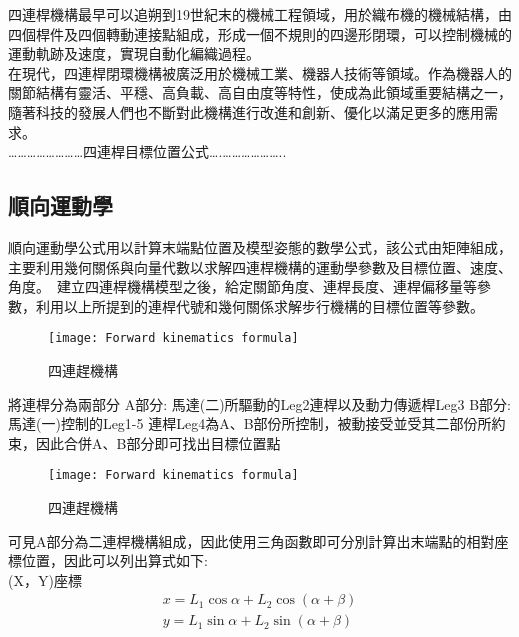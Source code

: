 四連桿機構最早可以追朔到19世紀末的機械工程領域，用於織布機的機械結構，由四個桿件及四個轉動連接點組成，形成一個不規則的四邊形閉環，可以控制機械的運動軌跡及速度，實現自動化編織過程。\\
在現代，四連桿閉環機構被廣泛用於機械工業、機器人技術等領域。作為機器人的關節結構有靈活、平穩、高負載、高自由度等特性，使成為此領域重要結構之一，隨著科技的發展人們也不斷對此機構進行改進和創新、優化以滿足更多的應用需求。\\

……………………四連桿目標位置公式….………………..

\subsection{順向運動學}
順向運動學公式用以計算末端點位置及模型姿態的數學公式，該公式由矩陣組成，主要利用幾何關係與向量代數以求解四連桿機構的運動學參數及目標位置、速度、角度。\
建立四連桿機構模型之後，給定關節角度、連桿長度、連桿偏移量等參數，利用以上所提到的連桿代號和幾何關係求解步行機構的目標位置等參數。\\

\begin{figure}[hbt!]
\begin{center}
\texttt{[image: Forward kinematics formula]}
\caption{\Large 四連趕機構}\label{Forward kinematics formula}
\end{center}
\end{figure}

將連桿分為兩部分
A部分: 馬達(二)所驅動的Leg2連桿以及動力傳遞桿Leg3
B部分:馬達(一)控制的Leg1-5
連桿Leg4為A、B部份所控制，被動接受並受其二部份所約束，因此合併A、B部分即可找出目標位置點

\begin{figure}[hbt!]
\begin{center}
\texttt{[image: Forward kinematics formula]}
\caption{\Large 四連趕機構}\label{Forward kinematics formula}
\end{center}
\end{figure}

可見A部分為二連桿機構組成，因此使用三角函數即可分別計算出末端點的相對座標位置，因此可以列出算式如下:\\

(X，Y)座標    
\[
\begin{aligned}
x=L_{1}\cos \alpha +L_{2}\cos \left( \alpha +\beta \right)\\
y=L_{1}\sin \alpha +L_{2}\sin \left( \alpha +\beta \right) 
\end{aligned}
\]

